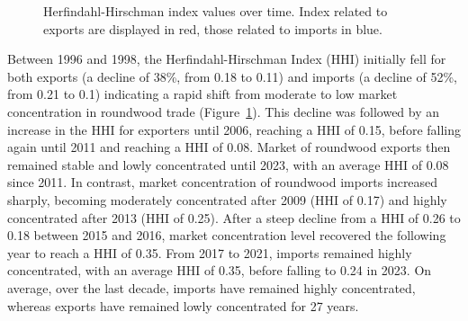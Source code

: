 \documentclass[
  authoryear,
  review,
  3p]{elsarticle}
\begin{document}
\begin{figure}[t]


\caption{\label{fig-market-concentration}Herfindahl-Hirschman index
values over time. Index related to exports are displayed in red, those
related to imports in blue.}

\end{figure}%

Between 1996 and 1998, the Herfindahl-Hirschman Index (HHI) initially
fell for both exports (a decline of 38\%, from 0.18 to 0.11) and imports
(a decline of 52\%, from 0.21 to 0.1) indicating a rapid shift from
moderate to low market concentration in roundwood trade
(Figure~\ref{fig-market-concentration}). This decline was followed by an
increase in the HHI for exporters until 2006, reaching a HHI of 0.15,
before falling again until 2011 and reaching a HHI of 0.08. Market of
roundwood exports then remained stable and lowly concentrated until
2023, with an average HHI of 0.08 since 2011. In contrast, market
concentration of roundwood imports increased sharply, becoming
moderately concentrated after 2009 (HHI of 0.17) and highly concentrated
after 2013 (HHI of 0.25). After a steep decline from a HHI of 0.26 to
0.18 between 2015 and 2016, market concentration level recovered the
following year to reach a HHI of 0.35. From 2017 to 2021, imports
remained highly concentrated, with an average HHI of 0.35, before
falling to 0.24 in 2023. On average, over the last decade, imports have
remained highly concentrated, whereas exports have remained lowly
concentrated for 27 years.
\end{document}
